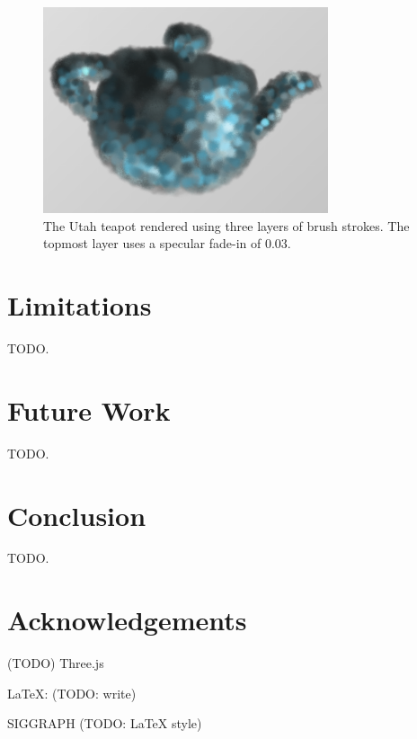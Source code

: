 \documentclass[conference]{acmsiggraph}
\begin{document}
\begin{figure}[ht]
  \centering
  \includegraphics[width=3.3in]{images/teapot_with_background}
  \caption{The Utah teapot rendered using three layers of brush strokes.
           The topmost layer uses a specular fade-in of 0.03.}
\end{figure}


\section{Limitations}

TODO.


\section{Future Work}

TODO.


\section{Conclusion}

TODO.


\section*{Acknowledgements}

(TODO) Three.js

\LaTeX : (TODO: write)

SIGGRAPH (TODO: LaTeX style)




\end{document}
